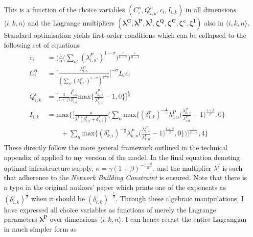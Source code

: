 \documentclass[11pt, oneside]{article}   	%
\begin{document}
\begin{spacing}{1.3}
This is a function of the choice variables $(C_{i}^{n}, Q_{i,k}^{n}, c_{i}, I_{i,k})$ in all dimensions $\langle i,k,n \rangle$ and the Lagrange multipliers $(\bm{\lambda^{C}}, \bm{\lambda^{P}}, \bm{\lambda^{I}}, \bm{\zeta^{Q}}, \bm{\zeta^{C}}, \bm{\zeta^{c}}, \bm{\zeta^{I}})$ also in $\langle i,k,n \rangle$. Standard optimisation yields first-order conditions which can be collapsed to the following set of equations
\begin{equation}
    \label{eq:foc}
  \begin{aligned}
    c_{i} & = \bigg( \frac{1}{\alpha} \Big( \sum_{n'}^{} (\lambda^{P}_{i,n'})^{1-\sigma}\Big)^{\frac{1}{1-\sigma}}\bigg)^{\frac{1}{\alpha-1}} \\
    C_{i}^{n} & = \Bigg[ \frac{\lambda^{P}_{i,n}}{(\sum_{n'}^{} (\lambda^{P}_{i,n'})^{1-\sigma})^{\frac{1}{1-\sigma}}} \Bigg]^{-\sigma}L_{i}c_{i} \\
    Q_{i,k}^{n} & = \Bigg[\frac{1}{1+\beta} \frac{I_{i,k}^{\gamma}}{\delta_{i,k}^{\tau}} \textrm{max}\Big\{\frac{\lambda^{P}_{k,n}}{\lambda^{P}_{i,n}}-1,0\Big\}\Bigg]^{\frac{1}{\beta}} \\
    I_{i,k} & = \textrm{max}\Bigg\{\Bigg[ \frac{\kappa}{\lambda^{I}(\delta^{I}_{i,k} + \delta^{I}_{k,i})} \bigg( \sum_{n}^{} \textrm{max}\Big\{ (\delta^{\tau}_{i,k})^{-\frac{1}{\beta}} \lambda^{P}_{i,n} \Big( \frac{\lambda^{P}_{k,n}}{\lambda^{P}_{i,n}}-1 \Big)^{\frac{1+\beta}{\beta}} , 0\Big\} \\
    & \qquad + \sum_{n}^{} \textrm{max}\Big\{ (\delta^{\tau}_{k,i})^{-\frac{1}{\beta}} \lambda^{P}_{k,n} \Big( \frac{\lambda^{P}_{i,n}}{\lambda^{P}_{k,n}}-1 \Big)^{\frac{1+\beta}{\beta}} , 0\Big\} \bigg) \Bigg]^{\frac{\beta}{\beta-\gamma}}, 4\Bigg\}
  \end{aligned}
\end{equation}
These directly follow the more general framework outlined in the technical appendix of \citeauthor{fajgelbaum_optimal_2017} applied to my version of the model. In the final equation denoting optimal infrastructure supply, $\kappa = \gamma(1+\beta)^{-\frac{1+\beta}{\beta}}$, and the multiplier $\lambda^{I}$ is such that adherence to the \emph{Network Building Constraint} is ensured. Note that there is a typo in the original authors' paper which prints one of the exponents as $(\delta^{\tau}_{i,k})^{\frac{1}{\beta}}$ when it should be $(\delta^{\tau}_{i,k})^{-\frac{1}{\beta}}$. Through these algebraic manipulations, I have expressed all choice variables as functions of merely the Lagrange parameters $\bm{\lambda^{P}}$ over dimensions $\langle i,k,n \rangle$. I can hence recast the entire Lagrangian in much simpler form as

\end{spacing}
\end{document}

